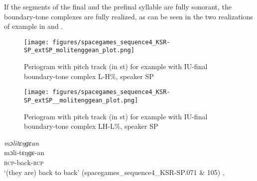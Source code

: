 
\z
\z




If the segments of the final and the prefinal syllable are fully sonorant, the boundary-tone complexes are fully realized, as can be seen in the two realizations of example   in   and . 




\begin{figure}
	\texttt{[image: figures/spacegames\_sequence4\_KSR-SP\_extSP\_molitenggean\_plot.png]}
	\caption{Periogram with pitch track (in st) for example  with IU-final boundary-tone complex L-H\%, speaker SP}
	\label{pitch_molitenggean1}
\end{figure}



\begin{figure}
	\texttt{[image: figures/spacegames\_sequence4\_KSR-SP\_extSP\_\_molitenggean\_plot.png]}
	\caption{Periogram with pitch track (in st) for example  with IU-final boundary-tone complex LH-L\%, speaker SP}
	\label{pitch_molitenggean2}
\end{figure}




\ea
\label{ex:molitenggean}
\textit{mɔlitɛŋɡɛan} \\
\gll mɔli-tɛŋɡɛ-an  \\
\textsc{rcp-}back\textsc{-rcp} \\ 
\glt ‘(they are) back to back’ \hfill(spacegames\_sequence4\_KSR-SP.071 \& 105)
	, 
\z


